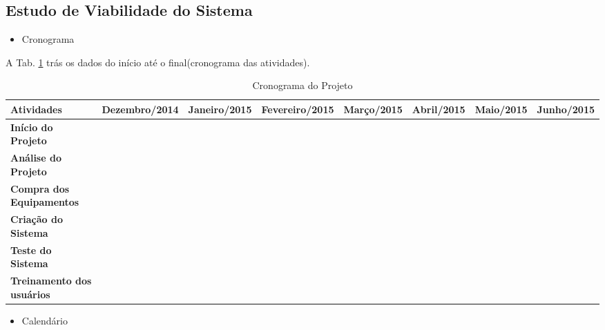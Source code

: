    \subsection{ Estudo de Viabilidade do Sistema }
   \begin{itemize}
    \item Cronograma
   \end{itemize}

 A Tab. \ref{Crono} trás os dados do início até o final(cronograma das atividades).

\begin{table}[h]
\centering
\begin{tabular}{|p{1.95cm}|p{1.8cm}|p{1.6cm}|p{1.7cm}|p{1.35cm}|p{1.25cm}|p{1.25cm}|p{1.3cm}|}
\hline
 \tiny{\textbf{Atividades}}               &  \tiny{\textbf{Dezembro/2014}}  &  \tiny{\textbf{Janeiro/2015}} &  \tiny{\textbf{Fevereiro/2015}} &  \tiny{\textbf{Março/2015}} &  \tiny{\textbf{Abril/2015}} &  \tiny{\textbf{Maio/2015}} &  \tiny{\textbf{Junho/2015}} \\ \hline
 \tiny{\textbf{Início do Projeto}}        &    \cellcolor{blue!25}            &              &                &            &            &            &            \\ \hline
 \tiny{\textbf{Análise do Projeto}}       &    \cellcolor{blue!25}            &              &                &            &            &            &            \\ \hline
 \tiny{\textbf{Compra dos Equipamentos}}  &               &   \cellcolor{blue!25}           &                &            &            &            &            \\ \hline
 \tiny{\textbf{Criação do Sistema}}       &               &   \cellcolor{blue!25}           & \cellcolor{blue!25}               & \cellcolor{blue!25}           &   \cellcolor{blue!25}         &            &            \\ \hline
 \tiny{\textbf{Teste do Sistema}}         &               &              &                &            &            &    \cellcolor{blue!25}        &            \\ \hline
 \tiny{\textbf{Treinamento dos usuários}} &               &              &                &            &            &            & \cellcolor{blue!25}           \\ \hline
\end{tabular}
\caption{Cronograma do Projeto} \label{Crono}
\end{table}


\begin{itemize}
 \item Calendário
\end{itemize}


